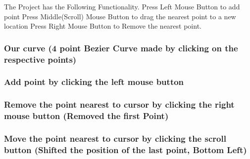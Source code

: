 The Project has the Following Functionality. Press Left Mouse Button to add point Press Middle(\+Scroll) Mouse Button to drag the nearest point to a new location Press Right Mouse Button to Remove the nearest point.

\subsubsection*{Our curve (4 point Bezier Curve made by clicking on the respective points)}



\subsubsection*{Add point by clicking the left mouse button}



\subsubsection*{Remove the point nearest to cursor by clicking the right mouse button (Removed the first Point)}



\subsubsection*{Move the point nearest to cursor by clicking the scroll button (Shifted the position of the last point, Bottom Left)}

 